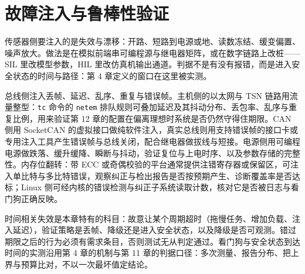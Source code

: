 \documentclass[12pt,a4paper,fontset=fandol]{ctexbook}
\newcommand{\Tp}[1]{\texttt{#1}}
\begin{document}
\section{故障注入与鲁棒性验证}
\label{sec:ch14-fault-injection}

传感器侧要注入的是失效与漂移：开路、短路到电源或地、读数冻结、缓变偏置、噪声放大。做法是在模拟前端串可编程源与继电器矩阵，或在数字链路上改桩——SIL 里改模型参数，HIL 里改仿真机输出通道。判据不是有没有报错，而是进入安全状态的时间与路径：第 4 章定义的窗口在这里被实测。

总线侧注入丢帧、延迟、乱序、重复与错误帧。主机侧的以太网与 TSN 链路用流量整型：\Tp{tc} 命令的 \Tp{netem} 排队规则可叠加延迟及其抖动分布、丢包率、乱序与重复比例，用来验证第 12 章的配置在偏离理想时系统是否仍然守得住期限。CAN 侧用 SocketCAN 的虚拟接口做纯软件注入，真实总线则用支持错误帧的接口卡或专用注入工具产生错误帧与总线关闭，配合继电器做拔线与短接。电源侧用可编程电源做跌落、缓升缓降、瞬断与抖动，验证复位与上电时序、以及参数存储的完整性。内存位翻转：带 ECC 或奇偶校验的平台通常提供注错寄存器或保留区，可注入单比特与多比特错误，观察纠正与检出报告是否按预期产生、诊断覆盖率是否达标；Linux 侧可经内核的错误检测与纠正子系统读取计数，核对它是否被日志与看门狗正确反映。

时间相关失效是本章特有的科目：故意让某个周期超时（拖慢任务、增加负载、注入延迟），验证策略是丢帧、降级还是进入安全状态，以及降级是否可观测。错过期限之后的行为必须有需求条目，否则测试无从判定通过。看门狗与安全状态到达时间的实测沿用第 4 章的机制与第 11 章的判据口径：多次测量、报告分布、把上界与预算比对，不以一次最坏值定结论。
\end{document}
